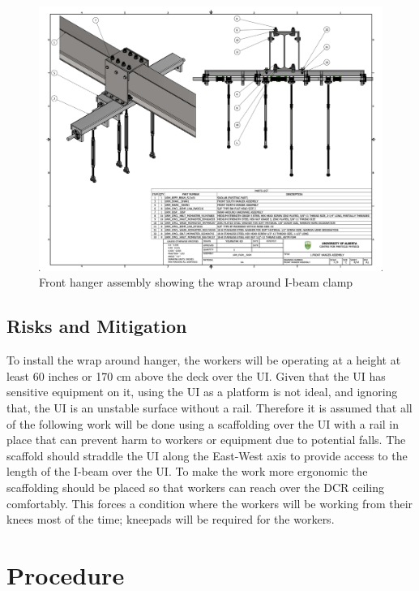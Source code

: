 \documentclass[11pt]{article}
\begin{document}
\begin{figure}[htbp]
\begin{center}
\includegraphics[width=\textwidth]{FrontHangerAssembly.png}
\caption{Front hanger assembly showing the wrap around I-beam clamp}
\label{fig:FHAClamp}
\end{center}
\end{figure}


\subsection{Risks and Mitigation}
To install the wrap around hanger, the workers will be operating at a height at least 60 inches or 170 cm above the deck over the UI. Given that the UI has sensitive equipment on it, using the UI as a platform is not ideal, and ignoring that, the UI is an unstable surface without a rail. Therefore it is assumed that all of the following work will be done using a scaffolding over the UI with a rail in place that can prevent harm to workers or equipment due to potential falls. The scaffold should straddle the UI along the East-West axis to provide access to the length of the I-beam over the UI.  To make the work more ergonomic the scaffolding should be placed so that workers can reach over the DCR ceiling comfortably. This forces a condition where the workers will be working from their knees most of the time; kneepads will be required for the workers. 

\section{Procedure}
\end{document}
